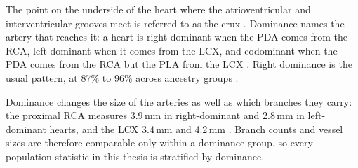 The point on the underside of the heart where the atrioventricular and interventricular grooves meet is referred to as the crux \cite{allwork1987applied}.
Dominance names the artery that reaches it: a heart is right-dominant when the PDA comes from the RCA, left-dominant when it comes from the LCX, and codominant when the PDA comes from the RCA but the PLA from the LCX \cite{devos2024coronary,allwork1987applied}.
Right dominance is the usual pattern, at 87\% to 96\% across ancestry groups \cite{ihdayhid2021ethnic}.

Dominance changes the size of the arteries as well as which branches they carry: the proximal RCA measures 3.9\,mm in right-dominant and 2.8\,mm in left-dominant hearts, and the LCX 3.4\,mm and 4.2\,mm \cite{dodge1992diameter}.
Branch counts and vessel sizes are therefore comparable only within a dominance group, so every population statistic in this thesis is stratified by dominance.
